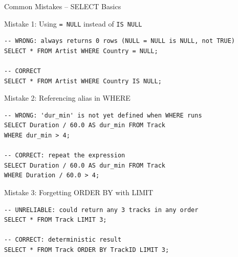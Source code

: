 \begin{frame}[fragile]{Common Mistakes -- SELECT Basics}
  \begin{alertblock}{Mistake 1: Using \texttt{= NULL} instead of \texttt{IS NULL}}
\begin{lstlisting}[style=sqlstyle]
-- WRONG: always returns 0 rows (NULL = NULL is NULL, not TRUE)
SELECT * FROM Artist WHERE Country = NULL;

-- CORRECT
SELECT * FROM Artist WHERE Country IS NULL;
\end{lstlisting}
  \end{alertblock}

  \begin{alertblock}{Mistake 2: Referencing alias in WHERE}
\begin{lstlisting}[style=sqlstyle]
-- WRONG: 'dur_min' is not yet defined when WHERE runs
SELECT Duration / 60.0 AS dur_min FROM Track
WHERE dur_min > 4;

-- CORRECT: repeat the expression
SELECT Duration / 60.0 AS dur_min FROM Track
WHERE Duration / 60.0 > 4;
\end{lstlisting}
  \end{alertblock}

  \begin{alertblock}{Mistake 3: Forgetting ORDER BY with LIMIT}
\begin{lstlisting}[style=sqlstyle]
-- UNRELIABLE: could return any 3 tracks in any order
SELECT * FROM Track LIMIT 3;

-- CORRECT: deterministic result
SELECT * FROM Track ORDER BY TrackID LIMIT 3;
\end{lstlisting}
  \end{alertblock}
\end{frame}
